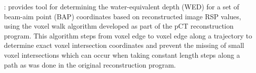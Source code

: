\begin{tcbenvironment}
\begin{tcbparagraph}
\begin{ThinEnum}[parsep=1mm]
\begin{ThinEnum}[parsep=1mm]
		\item {} : provides tool for determining the water-equivalent depth (WED) for a set of beam-aim point (BAP) coordinates based on reconstructed image RSP values, using the voxel walk algorithm developed as part of the pCT reconstruction program.  This algorithm steps from voxel edge to voxel edge along a trajectory to determine exact voxel intersection coordinates and prevent the missing of small voxel intersections which can occur when taking constant length steps along a path as was done in the original reconstruction program.
	\end{ThinEnum}
\end{ThinEnum}
\end{tcbparagraph}
\end{tcbenvironment}

